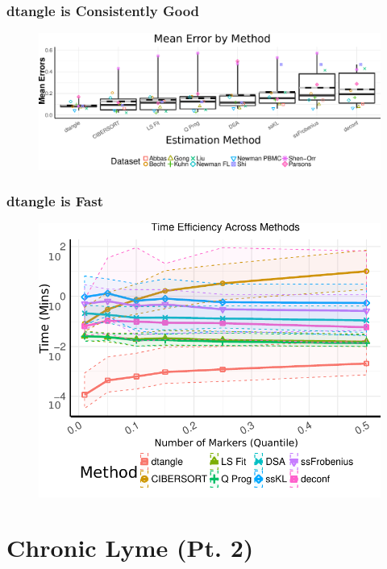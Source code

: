 \documentclass[usenames,dvipsnames,15pt,handout]{beamer}
\begin{document}
\begin{frame}
  \frametitle{dtangle is Consistently Good}
  \begin{figure}
  \hspace*{-1cm}
  \includegraphics[scale=.499]{pictures/meta_boxplots.pdf}
  \end{figure}
\end{frame}

\begin{frame}
  \frametitle{dtangle is Fast}
  \begin{figure}
  \hspace*{-1cm}
  \includegraphics[scale=.8]{pictures/time_plot.pdf}
  \end{figure}
\end{frame}

\section{Chronic Lyme (Pt. 2)}
\end{document}
